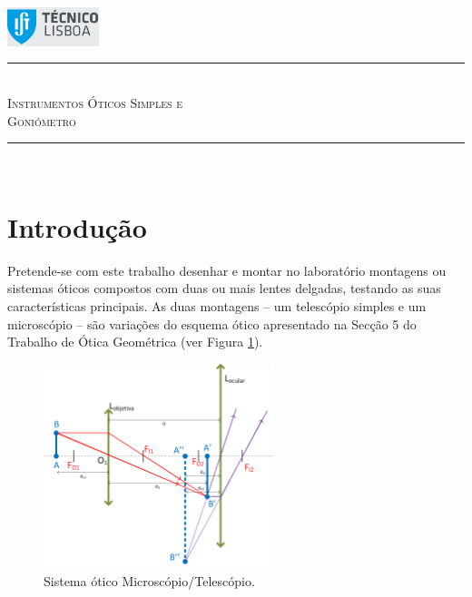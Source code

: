 \documentclass[a4paper,12pt]{article}      %
\author{Prof. Bernardo B. Carvalho}
\date{ Outubro 2012}
\newcommand{\HRule}{\rule{\linewidth}{0.5mm}}
\begin{document}
 

	\includegraphics[width=0.2\textwidth]{../logo-ist}%

	\HRule \\[0.5cm]
	{ \huge \sf  \textsc{Instrumentos Óticos Simples e \\ Goniómetro}} \\[0.4cm] %
	\HRule \\%

\section{\sf Introdução}
Pretende-se com este trabalho desenhar e montar no laboratório montagens ou sistemas óticos compostos com duas ou mais lentes delgadas, testando as suas características principais. As duas montagens -- um telescópio simples e um microscópio -- são variações do esquema ótico apresentado na Secção 5 do Trabalho de Ótica Geométrica (ver Figura \ref{fig:Telescopio}). 

\begin{figure}
	[!htb]  \centering 
	\includegraphics[width=0.6\textwidth]{Telescopio}
	\caption{Sistema ótico Microscópio/Telescópio. \label{fig:Telescopio}} 
\end{figure}
\end{document}
